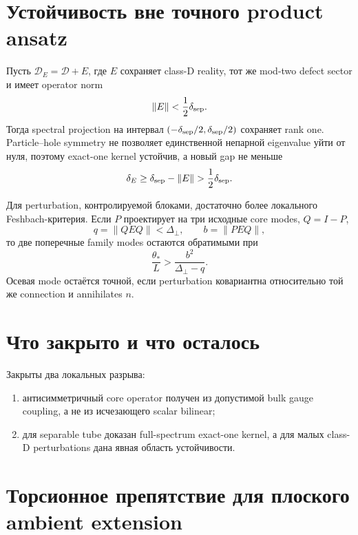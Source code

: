 \section{Устойчивость вне точного product ansatz}

Пусть \(\mathcal D_E=\mathcal D+E\), где \(E\) сохраняет class-D reality,
тот же mod-two defect sector и имеет operator norm
\begin{equation}
 \|E\|<\frac12\delta_{\rm sep}.
\end{equation}
Тогда spectral projection на интервал
\((-\delta_{\rm sep}/2,\delta_{\rm sep}/2)\) сохраняет rank one. Particle--hole
symmetry не позволяет единственной непарной eigenvalue уйти от нуля, поэтому
exact-one kernel устойчив, а новый gap не меньше
\begin{equation}
 \delta_E\geq\delta_{\rm sep}-\|E\|>\frac12\delta_{\rm sep}.
\end{equation}

Для perturbation, контролируемой блоками, достаточно более локального
Feshbach-критерия. Если \(P\) проектирует на три исходные core modes,
\(Q=I-P\),
\begin{equation}
 q=\|QEQ\|<\Delta_\perp,
 \qquad
 b=\|PEQ\|,
\end{equation}
то две поперечные family modes остаются обратимыми при
\begin{equation}
 \frac{\theta_*}{L}>
 \frac{b^2}{\Delta_\perp-q}.
\end{equation}
Осевая mode остаётся точной, если perturbation ковариантна относительно той
же connection и annihilates \(n\).

\section{Что закрыто и что осталось}

Закрыты два локальных разрыва:
\begin{enumerate}
 \item антисимметричный core operator получен из допустимой bulk gauge
 coupling, а не из исчезающего scalar bilinear;
 \item для separable tube доказан full-spectrum exact-one kernel, а для
 малых class-D perturbations дана явная область устойчивости.
\end{enumerate}

\section{Торсионное препятствие для плоского ambient extension}

